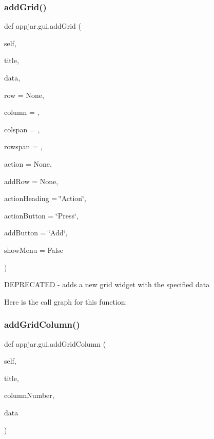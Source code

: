 \subsubsection{\texorpdfstring{add\+Grid()}{addGrid()}}
{\footnotesize\ttfamily def appjar.\+gui.\+add\+Grid (\begin{DoxyParamCaption}\item[{}]{self,  }\item[{}]{title,  }\item[{}]{data,  }\item[{}]{row = {\ttfamily None},  }\item[{}]{column = {},  }\item[{}]{colspan = {},  }\item[{}]{rowspan = {},  }\item[{}]{action = {\ttfamily None},  }\item[{}]{add\+Row = {\ttfamily None},  }\item[{}]{action\+Heading = {\ttfamily \char`\"{}Action\char`\"{}},  }\item[{}]{action\+Button = {\ttfamily \char`\"{}Press\char`\"{}},  }\item[{}]{add\+Button = {\ttfamily \char`\"{}Add\char`\"{}},  }\item[{}]{show\+Menu = {\ttfamily False} }\end{DoxyParamCaption})}

\begin{DoxyVerb}DEPRECATED - adds a new grid widget with the specified data \end{DoxyVerb}
 Here is the call graph for this function\+:
\mbox{\label{classappjar_1_1gui_ad43b2e5b2a830398124aa50cc8458192}} 
\subsubsection{\texorpdfstring{add\+Grid\+Column()}{addGridColumn()}}
{\footnotesize\ttfamily def appjar.\+gui.\+add\+Grid\+Column (\begin{DoxyParamCaption}\item[{}]{self,  }\item[{}]{title,  }\item[{}]{column\+Number,  }\item[{}]{data }\end{DoxyParamCaption})}

